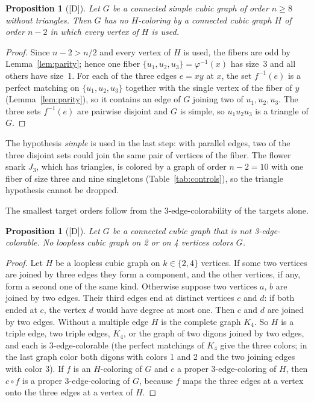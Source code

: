 \documentclass[11pt]{article}
\newtheorem{proposition}[theorem]{Proposition}
\theoremstyle{definition}
\theoremstyle{remark}
\newcommand{\evD}{\textnormal{[D]}}
\begin{document}
\begin{proposition}[\evD]\label{prop:nminus2}
Let $G$ be a connected simple cubic graph of order $n \ge 8$ without triangles. Then $G$ has no
$H$-coloring by a connected cubic graph $H$ of order $n - 2$ in which every vertex of $H$ is used.
\end{proposition}

\begin{proof}
Since $n - 2 > n/2$ and every vertex of $H$ is used, the fibers are odd by
Lemma~\ref{lem:parity}; hence one fiber $\{u_1, u_2, u_3\} = \varphi^{-1}(x)$ has size~3 and all
others have size~1. For each of the three edges $e = xy$ at $x$, the set $f^{-1}(e)$ is a perfect matching on
$\{u_1, u_2, u_3\}$ together with the single vertex of the fiber of $y$
(Lemma~\ref{lem:parity}), so it contains an edge of $G$ joining two of $u_1, u_2, u_3$. The three
sets $f^{-1}(e)$ are pairwise disjoint and $G$ is simple, so $u_1u_2u_3$ is a triangle of $G$.
\end{proof}

The hypothesis \emph{simple} is used in the last step: with parallel edges, two of the three disjoint sets could join the
same pair of vertices of the fiber. The flower snark $J_3$, which has triangles, is colored by a graph of order $n - 2 = 10$ with
one fiber of size three and nine singletons (Table~\ref{tab:controls}), so the triangle hypothesis cannot be dropped.

The smallest target orders follow from the 3-edge-colorability of the targets alone.

\begin{proposition}[\evD]\label{prop:small}
Let $G$ be a connected cubic graph that is not 3-edge-colorable. No loopless cubic graph on 2 or on 4 vertices colors $G$.
\end{proposition}

\begin{proof}
Let $H$ be a loopless cubic graph on $k \in \{2, 4\}$ vertices. If some two vertices are joined by three edges they form a
component, and the other vertices, if any, form a second one of the same kind. Otherwise suppose two vertices $a$, $b$ are joined by two edges.
Their third edges end at distinct vertices $c$ and $d$: if both ended at $c$, the vertex $d$ would have degree at most one. Then $c$ and $d$ are
joined by two edges. Without a multiple edge $H$ is the complete graph $K_4$. So $H$ is a triple edge, two triple edges, $K_4$, or the
graph of two digons joined by two edges, and each is 3-edge-colorable (the perfect matchings of $K_4$ give the three colors; in the last graph
color both digons with colors 1 and 2 and the two joining edges with color 3). If $f$ is an $H$-coloring of $G$ and $c$ a proper 3-edge-coloring of
$H$, then $c \circ f$ is a proper 3-edge-coloring of $G$, because $f$ maps the three edges at a vertex onto the three edges at a vertex of $H$.
\end{proof}
\end{document}
